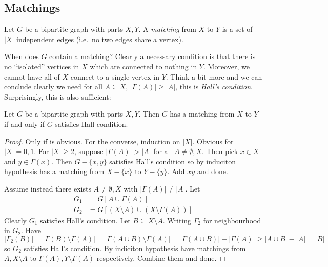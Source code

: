 \documentclass[a4paper]{article}
\begin{document}
\subsection{Matchings}

\begin{definition}[matching]
  Let \(G\) be a bipartite graph with parts \(X, Y\). A \emph{matching} from \(X\) to \(Y\) is a set of \(|X|\) independent edges (i.e.\ no two edges share a vertex).
\end{definition}

When does \(G\) contain a matching? Clearly a necessary condition is that there is no ``isolated'' vertices in \(X\) which are connected to nothing in \(Y\). Moreover, we cannot have all of \(X\) connect to a single vertex in \(Y\). Think a bit more and we can conclude clearly we need for all \(A \subseteq X\), \(|\Gamma(A)| \geq |A|\), this is \emph{Hall's condition}. Surprisingly, this is also sufficient:

\begin{theorem}[Hall]
  Let \(G\) be a bipartite graph with parts \(X, Y\). Then \(G\) has a matching from \(X\) to \(Y\) if and only if \(G\) satisfies Hall condition.
\end{theorem}

\begin{proof}
  Only if is obvious. For the converse, induction on \(|X|\). Obvious for \(|X| = 0, 1\). For \(|X| \geq 2\), suppose \(|\Gamma(A)| > |A|\) for all \(A \neq \emptyset, X\). Then pick \(x \in X\) and \(y \in \Gamma(x)\). Then \(G - \{x, y\}\) satisfies Hall's condition so by induciton hypothesis has a matching from \(X - \{x\}\) to \(Y - \{y\}\). Add \(xy\) and done.

  Assume instead there exists \(A \neq \emptyset, X\) with \(|\Gamma(A)| \neq |A|\). Let
  \begin{align*}
    G_1 &= G[A \cup \Gamma(A)] \\
    G_2 &= G[(X \setminus A) \cup (X \setminus \Gamma(A))]
  \end{align*}
  Clearly \(G_1\) satisfies Hall's condition. Let \(B \subseteq X \setminus A\). Writing \(\Gamma_2\) for neighbourhood in \(G_2\). Have
  \[
    |\Gamma_2(B)|
    = |\Gamma(B) \setminus \Gamma(A)|
    = |\Gamma(A \cup B) \setminus \Gamma(A)|
    = |\Gamma(A \cup B)| - |\Gamma(A)|
    \geq |A\cup B| - |A|
    = |B|
  \]
  so \(G_2\) satisfies Hall's condition. By indiciton hypothesis have matchings from \(A, X \setminus A\) to \(\Gamma(A), Y \setminus \Gamma(A)\) respectively. Combine them and done.
\end{proof}
\end{document}
